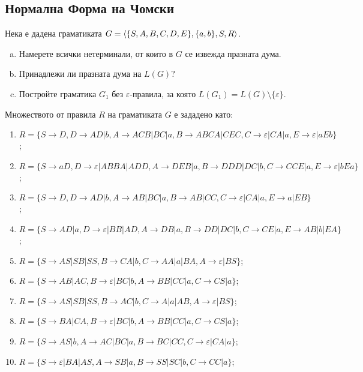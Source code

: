 \subsection{Нормална Форма на Чомски}

\begin{problem}
  Нека е дадена граматиката  $G = \langle{\{S,A,B,C,D,E\}, \{a,b\},S, R}\rangle$.
  \begin{enumerate}[a)]
  \item
    Намерете всички нетерминали, от които в $G$ се извежда празната дума.
  \item
    Принадлежи ли празната дума на $L(G)$?
  \item
    Постройте граматика $G_1$ без $\varepsilon$-правила, за която $L(G_1)=L(G)\setminus\{\varepsilon\}$.
  \end{enumerate}
  Множеството от правила $R$ на граматиката $G$ е зададено като:
  \begin{enumerate}
  \item
    $R = \{S\rightarrow D,D\rightarrow AD|b,A\rightarrow ACB|BC|a, B\rightarrow ABCA|CEC,C\rightarrow \varepsilon|CA|a, E\rightarrow \varepsilon|aEb\}$;
  \item
    $R = \{S \rightarrow aD, D\rightarrow \varepsilon|ABBA|ADD,A\rightarrow DEB|a,B\rightarrow DDD|DC|b,C\rightarrow CCE|a, E\rightarrow \varepsilon|bEa\}$;
  \item
    $R = \{ S\rightarrow D,D\rightarrow AD|b,A\rightarrow AB|BC|a, B\rightarrow AB|CC, C\rightarrow \varepsilon|CA|a, E\rightarrow a|EB\}$;
  \item
    $R = \{ S \rightarrow AD|a, D\rightarrow \varepsilon|BB|AD,A\rightarrow DB|a,B\rightarrow DD|DC|b,C\rightarrow CE|a, E\rightarrow AB|b|EA\}$;
  \item
    $R =\{S\rightarrow AS|SB|SS,B\rightarrow CA|b, C\rightarrow AA|a|BA,A\rightarrow \varepsilon|BS\}$;
  \item
    $R = \{S\rightarrow AB|AC,B\rightarrow \varepsilon |BC|b,A\rightarrow BB|CC|a,C\rightarrow CS|a\}$;
  \item
    $R = \{S\rightarrow AS|SB|SS,B\rightarrow AC|b, C\rightarrow A|a|AB,A\rightarrow \varepsilon|BS\}$;
  \item
    $R = \{S\rightarrow BA|CA,B\rightarrow \varepsilon |BC|b,A\rightarrow BB|CC|a, C\rightarrow CS|a\}$;
  \item
    $R = \{S\rightarrow AS|b,A\rightarrow AC|BC|a, B\rightarrow BC|CC,C\rightarrow \varepsilon|CA|a\}$;
  \item
    $R = \{S\rightarrow \varepsilon|BA|AS,A\rightarrow SB|a,B\rightarrow SS|SC|b,
    C\rightarrow CC|a\}$; 
  \end{enumerate}
\end{problem}

